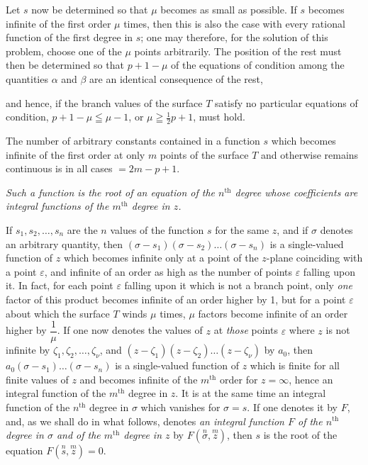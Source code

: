 \documentclass{article}
\begin{document}
Let $s$ now be determined so that $\mu$ becomes as small as possible. If $s$ becomes infinite of the first order $\mu$ times, then this is also the case with every rational function of the first degree in $s$; one may therefore, for the solution of this problem, choose one of the $\mu$ points arbitrarily. The position of the rest must then be determined so that $p+1-\mu$ of the equations of condition among the quantities $\alpha$ and $\beta$ are an identical consequence of the rest,

and hence, if the branch values of the surface $T$ satisfy no particular equations of condition, $p+1-\mu \leqq \mu-1$, or $\mu \geqq \frac{1}{2}p+1$, must hold.

The number of arbitrary constants contained in a function $s$ which becomes infinite of the first order at only $m$ points of the surface $T$ and otherwise remains continuous is in all cases $= 2m-p+1$.

\emph{Such a function is the root of an equation of the $n^{\text{th}}$ degree whose coefficients are integral functions of the $m^{\text{th}}$ degree in $z$.}

If $s_{1}, s_{2}, \ldots, s_{n}$ are the $n$ values of the function $s$ for the same $z$, and if $\sigma$ denotes an arbitrary quantity, then $(\sigma-s_{1})(\sigma-s_{2}) \ldots (\sigma-s_{n})$ is a single-valued function of $z$ which becomes infinite only at a point of the $z$-plane coinciding with a point $\varepsilon$, and infinite of an order as high as the number of points $\varepsilon$ falling upon it. In fact, for each point $\varepsilon$ falling upon it which is not a branch point, only \emph{one} factor of this product becomes infinite of an order higher by 1, but for a point $\varepsilon$ about which the surface $T$ winds $\mu$ times, $\mu$ factors become infinite of an order higher by $\dfrac{1}{\mu}$. If one now denotes the values of $z$ at \emph{those} points $\varepsilon$ where $z$ is not infinite by $\zeta_{1}, \zeta_{2}, \ldots, \zeta_{\nu}$, and $(z-\zeta_{1})(z-\zeta_{2}) \ldots (z-\zeta_{\nu})$ by $a_{0}$, then $a_{0}(\sigma-s_{1}) \ldots (\sigma-s_{n})$ is a single-valued function of $z$ which is finite for all finite values of $z$ and becomes infinite of the $m^{\text{th}}$ order for $z = \infty$, hence an integral function of the $m^{\text{th}}$ degree in $z$. It is at the same time an integral function of the $n^{\text{th}}$ degree in $\sigma$ which vanishes for $\sigma = s$. If one denotes it by $F$, and, as we shall do in what follows, denotes \emph{an integral function $F$ of the $n^{\text{th}}$ degree in $\sigma$ and of the $m^{\text{th}}$ degree in $z$} by $F(\overset{n}{\sigma}, \overset{m}{z})$, then $s$ is the root of the equation $F(\overset{n}{s}, \overset{m}{z}) = 0$.
\end{document}
